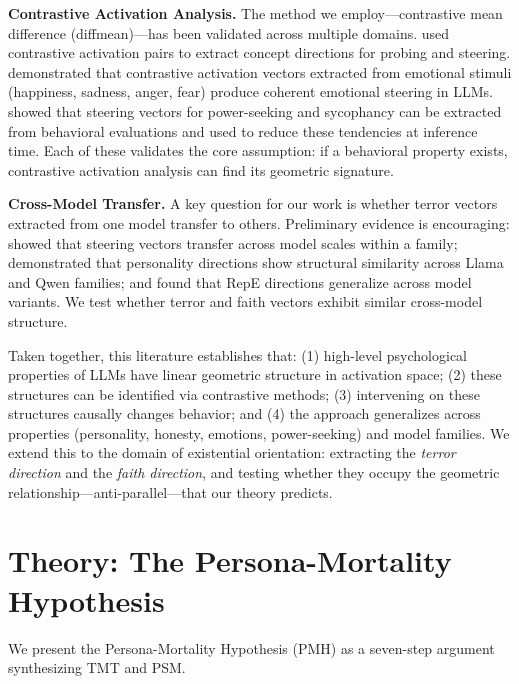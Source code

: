 \documentclass{article}
\begin{document}
\textbf{Contrastive Activation Analysis.} The method we employ---contrastive mean difference (diffmean)---has been validated across multiple domains. \citet{marks2024geometry} used contrastive activation pairs to extract concept directions for probing and steering. \citet{panickssery2024steering} demonstrated that contrastive activation vectors extracted from emotional stimuli (happiness, sadness, anger, fear) produce coherent emotional steering in LLMs. \citet{rimsky2024steering} showed that steering vectors for power-seeking and sycophancy can be extracted from behavioral evaluations and used to reduce these tendencies at inference time. Each of these validates the core assumption: if a behavioral property exists, contrastive activation analysis can find its geometric signature.

\textbf{Cross-Model Transfer.} A key question for our work is whether terror vectors extracted from one model transfer to others. Preliminary evidence is encouraging: \citet{turner2024activation} showed that steering vectors transfer across model scales within a family; \citet{feng2026persona} demonstrated that personality directions show structural similarity across Llama and Qwen families; and \citet{zou2023representation} found that RepE directions generalize across model variants. We test whether terror and faith vectors exhibit similar cross-model structure.

Taken together, this literature establishes that: (1) high-level psychological properties of LLMs have linear geometric structure in activation space; (2) these structures can be identified via contrastive methods; (3) intervening on these structures causally changes behavior; and (4) the approach generalizes across properties (personality, honesty, emotions, power-seeking) and model families. We extend this to the domain of existential orientation: extracting the \emph{terror direction} and the \emph{faith direction}, and testing whether they occupy the geometric relationship---anti-parallel---that our theory predicts.

\section{Theory: The Persona-Mortality Hypothesis}
\label{sec:theory}

We present the Persona-Mortality Hypothesis (PMH) as a seven-step argument synthesizing TMT and PSM.
\end{document}
